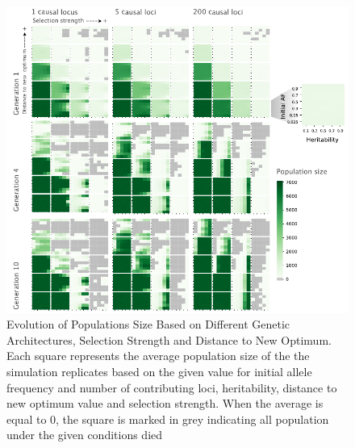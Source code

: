 \documentclass{article}
\begin{document}
\begin{figure}[b]
    \centering
    \includegraphics[width=1\textwidth]{figures/pop_size_poly_overtime.pdf}
    \caption{Evolution of Populations Size Based on Different Genetic Architectures, Selection Strength and Distance to New Optimum. Each square represents the average population size of the the simulation replicates based on the given value for initial allele frequency and number of contributing loci, heritability, distance to new optimum value and selection strength. When the average is equal to 0, the square is marked in grey indicating all population under the given conditions died}
    \label{fig:pop_size_poly_overtime}
\end{figure}
\end{document}

